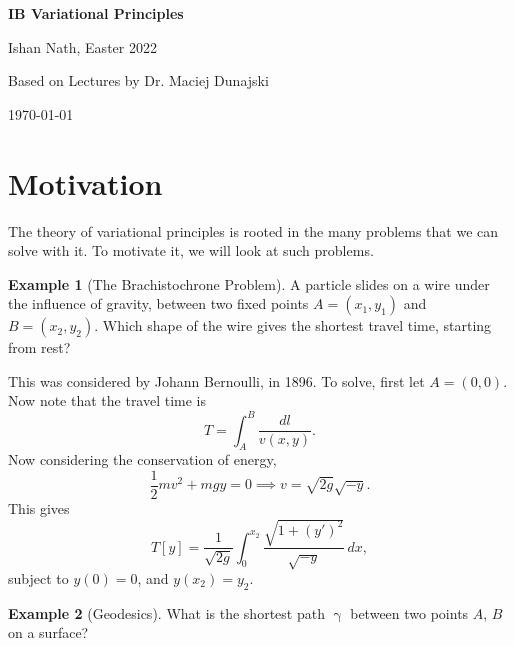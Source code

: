 \documentclass[12pt]{article}
\theoremstyle{definition}
\newtheorem{example}{Example}[section]
\theoremstyle{remark}
\begin{document}
\hypersetup{pageanchor=false}
\begin{titlepage}
	\begin{center}
		\vspace*{1em}
		\Huge
		\textbf{IB Variational Principles}

		\vspace{1em}
		\large
		Ishan Nath, Easter 2022

		\vspace{1.5em}

		\Large

		Based on Lectures by Dr. Maciej Dunajski

		\vspace{1em}

		\large
		\today
	\end{center}
	
\end{titlepage}
\hypersetup{pageanchor=true}

\tableofcontents

\newpage

\setcounter{section}{-1}

\section{Motivation}%
\label{sec:motivation}

The theory of variational principles is rooted in the many problems that we can solve with it. To motivate it, we will look at such problems.

\begin{example}[The Brachistochrone Problem]
\label{ex:brach0}
	A particle slides on a wire under the influence of gravity, between two fixed points $A = (x_1, y_1)$ and $B = (x_2, y_2)$. Which shape of the wire gives the shortest travel time, starting from rest?
\end{example}

This was considered by Johann Bernoulli, in 1896. To solve, first let $A = (0, 0)$. Now note that the travel time is
\[
	T = \int_{A}^{B} \frac{dl}{v(x, y)}
.\]
Now considering the conservation of energy,
\[
	\frac{1}{2} mv^2 + mgy = 0 \implies v = \sqrt{2g} \sqrt{-y}
.\]
This gives
\[
	T[y] = \frac{1}{\sqrt{2g}} \int_{0}^{x_2} \frac{\sqrt{1 + (y')^2}}{\sqrt{-y}} \, dx
,\]
subject to $y(0) = 0$, and $y(x_2) = y_2$.

\begin{example}[Geodesics]
	What is the shortest path $\upgamma$ between two points $A$, $B$ on a surface?
\end{example}
\end{document}
